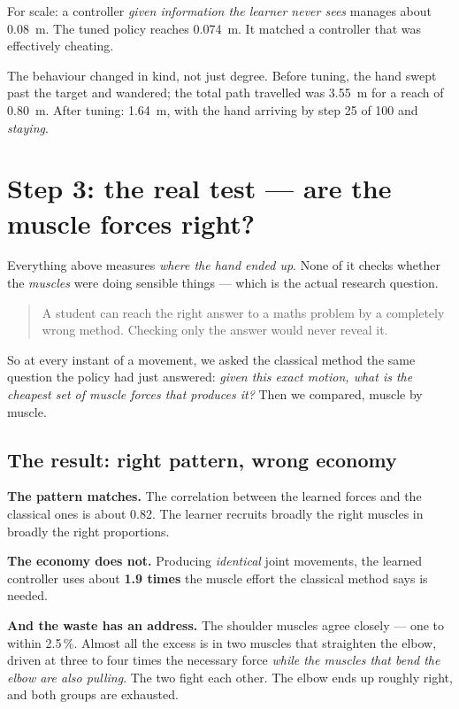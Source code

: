 \documentclass[11pt, a4paper]{article}
\begin{document}
For scale: a controller \emph{given information the learner never sees} manages
about \SI{0.08}{\meter}. The tuned policy reaches \SI{0.074}{\meter}. It matched
a controller that was effectively cheating.

The behaviour changed in kind, not just degree. Before tuning, the hand swept
past the target and wandered; the total path travelled was \SI{3.55}{\meter} for
a reach of \SI{0.80}{\meter}. After tuning: \SI{1.64}{\meter}, with the hand
arriving by step 25 of 100 and \emph{staying}.

\section{Step 3: the real test --- are the muscle forces right?}

Everything above measures \emph{where the hand ended up}. None of it checks
whether the \emph{muscles} were doing sensible things --- which is the actual
research question.

\begin{quote}
A student can reach the right answer to a maths problem by a completely wrong
method. Checking only the answer would never reveal it.
\end{quote}

So at every instant of a movement, we asked the classical method the same
question the policy had just answered: \emph{given this exact motion, what is the
cheapest set of muscle forces that produces it?} Then we compared, muscle by
muscle.

\subsection{The result: right pattern, wrong economy}

\textbf{The pattern matches.} The correlation between the learned forces and the
classical ones is about 0.82. The learner recruits broadly the right muscles in
broadly the right proportions.

\textbf{The economy does not.} Producing \emph{identical} joint movements, the
learned controller uses about \textbf{1.9 times} the muscle effort the classical
method says is needed.

\textbf{And the waste has an address.} The shoulder muscles agree closely --- one
to within 2.5\,\%. Almost all the excess is in two muscles that straighten the
elbow, driven at three to four times the necessary force \emph{while the muscles
that bend the elbow are also pulling}. The two fight each other. The elbow ends
up roughly right, and both groups are exhausted.
\end{document}
